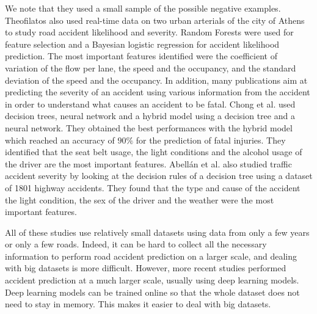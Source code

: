 \documentclass[conference]{IEEEtran}
\begin{document}
We note that they used a small sample of the possible negative examples.
Theofilatos\cite{Theofilatos2017} also used real-time data on two urban arterials of the city of Athens to study road accident likelihood and severity.
Random Forests were used for feature selection and a Bayesian logistic regression for accident likelihood prediction.
The most important features identified were the coefficient of variation of the flow per lane, the speed and the occupancy, and the standard deviation of the speed and the occupancy.
In addition, many publications aim at predicting the severity of an accident using various information from the accident in order to understand what causes an accident to be fatal.
Chong et al.\cite{Chong2005} used decision trees, neural network and a hybrid model using a decision tree and a neural network.
They obtained the best performances with the hybrid model which reached an accuracy of $90\%$ for the prediction of fatal injuries.
They identified that the seat belt usage, the light conditions and the alcohol usage of the driver are the most important features.
Abellán et al. \cite{Abellan2013} also studied traffic accident severity by looking at the decision rules of a decision tree using a dataset of 1801 highway accidents.
They found that the type and cause of the accident the light condition, the sex of the driver and the weather were the most important features.

All of these studies use relatively small datasets using data from only a few years or only a few roads.
Indeed, it can be hard to collect all the necessary information to perform road accident prediction on a larger scale, and dealing with big datasets is more difficult.
However, more recent studies performed accident prediction at a much larger scale, usually using deep learning models.
Deep learning models can be trained online so that the whole dataset does not need to stay in memory.
This makes it easier to deal with big datasets.
\end{document}
